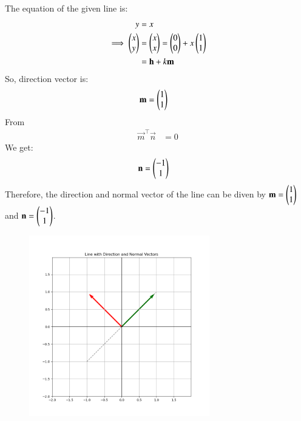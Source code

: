 \documentclass[journal]{IEEEtran}
\begin{document}
The equation of the given line is:
\begin{align}
	y&=x\\
	\implies \begin{pmatrix}x \\ y\end{pmatrix} &= \begin{pmatrix}x\\ x\end{pmatrix} = \begin{pmatrix}0\\0\end{pmatrix} + x\begin{pmatrix}1\\1\end{pmatrix}\\
	&=\mathbf{h} + k\mathbf{m}
\end{align}
So, direction vector is:
\begin{align}
	\mathbf{m} &= \begin{pmatrix}1\\1\end{pmatrix}
\end{align}
From 
\begin{align}
	\vec{m}^\top\vec{n}&=0
\end{align}
We get:
\begin{align}
	\mathbf{n}&=\begin{pmatrix}-1\\1\end{pmatrix}
\end{align}
Therefore, the direction and normal vector of the line can be diven by $\mathbf{m} =\begin{pmatrix}1\\1\end{pmatrix}$ and $\mathbf{n} = \begin{pmatrix}-1\\1\end{pmatrix}$.
\newpage
\begin{figure}[h!]
\begin{center}
	\includegraphics[width=0.7\textwidth]{Fig/fig.png}
	\caption{}
	\label{fig:4-4.2-13 - Figure -1}
\end{center}
\end{figure}
\end{document}
